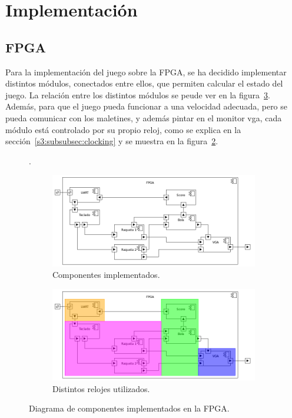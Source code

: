 \section{Implementación}
\label{s3:sec:Implementacion}


\subsection{FPGA}
\label{s3:subsec:fpga}
Para la implementación del juego sobre la FPGA, se ha decidido implementar
distintos módulos, conectados entre ellos, que permiten calcular el estado
del juego. La relación entre los distintos módulos se peude ver en la
figura~\ref{s3:fig:componentes-fpga-a}. Además, para que el juego pueda
funcionar a una velocidad adecuada, pero se pueda comunicar con los
maletines, y además pintar en el monitor vga, cada módulo está controlado
por su propio reloj, como se explica en la sección~\ref{s3:subsubsec:clocking}
y se muestra en la figura~\ref{s3:fig:componentes-fpga-clocking}. 


\begin{figure}[h]
.\\
\centering
\begin{subfigure}{.5\textwidth}
  \centering
  \includegraphics[width=1.0\textwidth]{images/fpga_componentes.png}
  \caption{Componentes implementados.}
  \label{s3:fig:componentes-fpga-a}
\end{subfigure}%
\begin{subfigure}{.5\textwidth}
  \centering
  \includegraphics[width=1.0\textwidth]{images/fpga_componentes_timing.png}
  \caption{Distintos relojes utilizados.}
  \label{s3:fig:componentes-fpga-clocking}
\end{subfigure}
\caption{Diagrama de componentes implementados en la FPGA. }
\label{s3:fig:componentes-fpga-a}
\end{figure}

